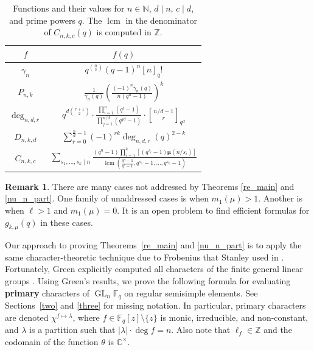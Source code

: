 \documentclass[10pt]{article}
\theoremstyle{definition}
\newtheorem{remark}[theorem]{Remark}
\DeclareMathOperator{\GL}{GL}
\DeclareMathOperator{\lcm}{lcm}
\newcommand{\Cbb}{\mathbb{C}}
\newcommand{\F}{\mathbb{F}}
\newcommand{\N}{\mathbb{N}}
\newcommand{\Z}{\mathbb{Z}}
\newcommand{\moebius}{\pmb{\mu}}
\newcommand{\myemph}{\textbf}
\newcommand{\te}{\theta}
\begin{document}
\begin{table}[ht]
\caption{Functions and their values for \(n \in \N\), \(d \mid n\), \(c \mid d\), and prime powers \(q\). The \(\lcm\) in the denominator of \(C_{n,k,c}(q)\) is computed in \(\Z\).}
\centering
\renewcommand{\arraystretch}{2}
\begin{tabular}{|c|c|}
\hline
\(f\) & \(f(q)\) \\
\hline
\(
\gamma_{n}\) & \(q^{\binom{n}{2}} (q-1)^n [n]_q!
\) \\
\(
P_{n,k}\) & \(
\frac{1}{\gamma_{n}(q)}
\left ( \frac{(-1)^n \gamma_n (q)}{n (q^n-1)} \right )^k
\) \\
\(
\deg_{n,d,r}\) & \(
q^{d \binom{r+1}{2}}
\cdot
\frac{\prod_{i=1}^n (q^i - 1)}{\prod_{j=1}^{n/d} (q^{jd} - 1)}
\cdot
{\genfrac[]{0pt}{1}{n/d - 1}{r}}_{q^d}
\) \\
\(
D_{n,k,d} \) & \(
\sum_{r = 0}^{\tfrac{n}{d} - 1}
(-1)^{rk} \deg_{n,d,r}(q)^{2-k}
\) \\
\(
C_{n,k,c}\) & \(
\sum_{s_1,\ldots,s_k \mid n}
\frac{(q^n-1)\prod_{i=1}^k \left [ (q^{s_i}-1) \moebius( n / s_i ) \right ]}{\lcm \left (
\tfrac{q^n-1}{q^c-1},
q^{s_1}-1,
\ldots,
q^{s_k}-1
\right ) }
\) \\
\hline
\end{tabular}
\label{formula_table}
\end{table}







\begin{remark}
There are many cases not addressed by Theorems \ref{re_main} and \ref{nu_n_part}.
One family of unaddressed cases is when \(m_1(\mu) > 1\).
Another is when \(\ell > 1\) and \(m_1(\mu) = 0\).
It is an open problem to find efficient formulas for \(g_{k,\mu} (q)\) in these cases.
\end{remark}











Our approach to proving Theorems~\ref{re_main} and \ref{nu_n_part} is to apply the same character-theoretic technique due to Frobenius that Stanley used in \cite{ncycle}.
Fortunately, Green explicitly computed all characters of the finite general linear groups \cite{green}.
Using Green's results, we prove the following formula for evaluating \myemph{primary} characters of \(\GL_n \F_q\) on regular semisimple elements.
See Sections~\ref{two} and \ref{three} for missing notation.
In particular,
primary characters are denoted \(\chi^{f \mapsto \lambda}\), where \(f \in \F_q [z] \setminus \{z\}\) is monic, irreducible, and non-constant, and \(\lambda\) is a partition such that \(|\lambda| \cdot \deg f = n\).
Also note that \(\ell_f \in \Z\) and the codomain of the function \(\te\) is \(\Cbb^\times\).
\end{document}
